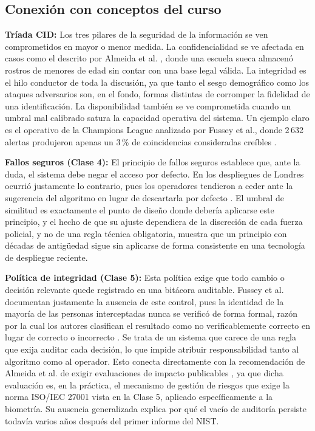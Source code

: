 \subsection{Conexión con conceptos del curso}

\textbf{Tríada CID:} Los tres pilares de la seguridad de la
información se ven comprometidos en mayor o menor medida. La
confidencialidad se ve afectada en casos como el descrito por Almeida
et al. \cite{almeida_ethics_2022}, donde una escuela sueca almacenó
rostros de menores de edad sin contar con una base legal válida. La
integridad es el hilo conductor de toda la discusión, ya que tanto el
sesgo demográfico \cite{grother_nistir8280_2019,kotwal_fairness_2026}
como los ataques adversarios \cite{vakhshiteh_adversarial_2021} son,
en el fondo, formas distintas de corromper la fidelidad de una
identificación. La disponibilidad también se ve comprometida cuando
un umbral mal calibrado satura la capacidad operativa del sistema. Un
ejemplo claro es el operativo de la Champions League analizado por
Fussey et al., donde 2\,632 alertas produjeron apenas un 3\,\% de
coincidencias consideradas creíbles \cite{fussey_assisted_2020}.

\textbf{Fallos seguros (Clase 4):} El principio de fallos seguros
establece que, ante la duda, el sistema debe negar el acceso por
defecto. En los despliegues de Londres ocurrió justamente lo
contrario, pues los operadores tendieron a ceder ante la sugerencia
del algoritmo en lugar de descartarla por defecto
\cite{fussey_assisted_2020}. El umbral de similitud es exactamente el
punto de diseño donde debería aplicarse este principio, y el hecho de
que su ajuste dependiera de la discreción de cada fuerza policial, y
no de una regla técnica obligatoria, muestra que un principio con
décadas de antigüedad sigue sin aplicarse de forma consistente en una
tecnología de despliegue reciente.

\textbf{Política de integridad (Clase 5):} Esta política exige que
todo cambio o decisión relevante quede registrado en una bitácora
auditable. Fussey et al. documentan justamente la ausencia de este
control, pues la identidad de la mayoría de las personas interceptadas
nunca se verificó de forma formal, razón por la cual los autores
clasifican el resultado como no verificablemente correcto en lugar de
correcto o incorrecto \cite{fussey_assisted_2020}. Se trata de un
sistema que carece de una regla que exija auditar cada decisión, lo
que impide atribuir responsabilidad tanto al algoritmo como al
operador. Esto conecta directamente con la recomendación de Almeida et
al. de exigir evaluaciones de impacto publicables
\cite{almeida_ethics_2022}, ya que dicha evaluación es, en la
práctica, el mecanismo de gestión de riesgos que exige la norma
ISO/IEC 27001 vista en la Clase 5, aplicado específicamente a la
biometría. Su ausencia generalizada explica por qué el vacío de
auditoría persiste todavía varios años después del primer informe del
NIST.